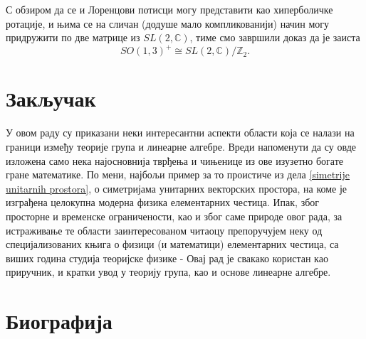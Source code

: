 \documentclass{report}
\theoremstyle{plain}
\theoremstyle{definition}
\begin{document}
С обзиром да се и Лоренцови потисци могу представити као хиперболичке ротације, и њима се на сличан (додуше мало компликованији) начин могу придружити по две матрице из $SL(2, \mathbb{C})$, тиме смо завршили доказ да је заиста
$$SO(1, 3)^+\cong SL(2, \mathbb{C})/\mathbb{Z}_2.$$


\chapter{Закључак}

У овом раду су приказани неки интересантни аспекти области која се налази на граници између теорије група и линеарне алгебре.
Вреди напоменути да су овде изложена само нека најосновнија тврђења и чињенице из ове изузетно богате гране математике. По мени, најбољи пример за то проистиче из дела \ref{simetrije unitarnih prostora}, о симетријама унитарних векторских простора, на коме је изграђена целокупна модерна физика елементарних честица. Ипак, због просторне и временске ограничености, као и због саме природе овог рада, за истраживање те области заинтересованом читаоцу препоручујем неку од специјализованих књига о физици (и математици) елементарних честица, са виших година студија теоријске физике - Овај рад је свакако користан као приручник, и кратки увод у теорију група, као и основе линеарне алгебре.

\nocite{*}



\chapter*{Биографија}
\end{document}

